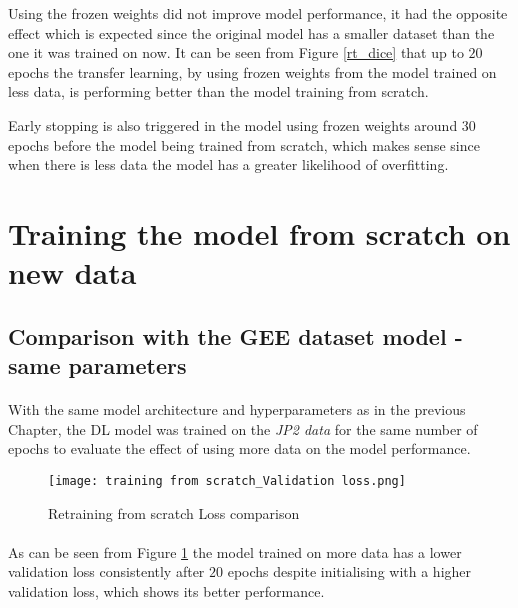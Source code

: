 Using the frozen weights did not improve model performance, it had the opposite effect which is expected since the original model has a smaller dataset than the one it was trained on now. It can be seen from Figure \ref{rt_dice} that up to $20$ epochs the transfer learning, by using frozen weights from the model trained on less data, is performing better than the model training from scratch. 

Early stopping is also triggered in the model using frozen weights around $30$ epochs before the model being trained from scratch, which makes sense since when there is less data the model has a greater likelihood of overfitting.

\section{Training the model from scratch on new data} \label{new_data_fs}
\subsection{Comparison with the \gls{GEE} dataset model - same parameters}
\paragraph{}
With the same model architecture and hyperparameters as in the previous Chapter, the \gls{DL} model was trained on the \textit{JP2 data} for the same number of epochs to evaluate the effect of using more data on the model performance.

\begin{figure}[hbt!]
    \centering
    \texttt{[image: training from scratch\_Validation loss.png]}
    \caption{Retraining from scratch Loss comparison}
    \label{fs_loss}
\end{figure}
\paragraph{}
As can be seen from Figure \ref{fs_loss} the model trained on more data has a lower validation loss consistently after $20$ epochs despite initialising with a higher validation loss, which shows its better performance. 

